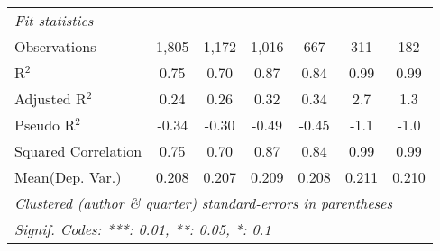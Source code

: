 \begin{tabular}{lcccccc}
   \midrule
   \emph{Fit statistics}\\
   Observations                                               & 1,805          & 1,172         & 1,016   & 667            & 311            & 182\\  
   R$^2$                                                      & 0.75           & 0.70          & 0.87    & 0.84           & 0.99           & 0.99\\  
   Adjusted R$^2$                                             & 0.24           & 0.26          & 0.32    & 0.34           & 2.7            & 1.3\\  
   Pseudo R$^2$                                               & -0.34          & -0.30         & -0.49   & -0.45          & -1.1           & -1.0\\  
   Squared Correlation                                        & 0.75           & 0.70          & 0.87    & 0.84           & 0.99           & 0.99\\  
Mean(Dep. Var.) & 0.208 & 0.207 & 0.209 & 0.208 & 0.211 & 0.210 \\
   \midrule \midrule
   \multicolumn{7}{l}{\emph{Clustered (author \& quarter) standard-errors in parentheses}}\\
   \multicolumn{7}{l}{\emph{Signif. Codes: ***: 0.01, **: 0.05, *: 0.1}}\\
\end{tabular}
\par\endgroup
